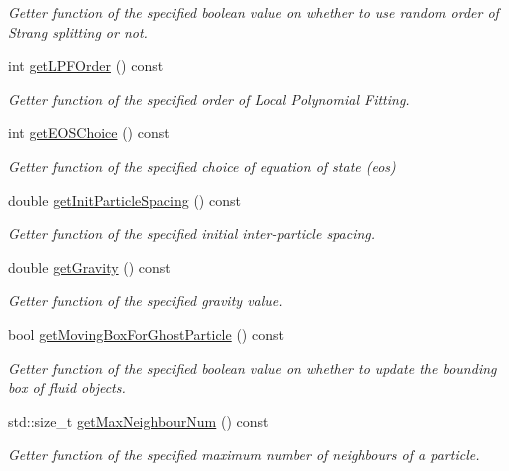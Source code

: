\begin{DoxyCompactItemize}
\begin{DoxyCompactList}\small\item\em Getter function of the specified boolean value on whether to use random order of Strang splitting or not. \end{DoxyCompactList}\item 
int \hyperlink{classInitializer_a03411fd19b6b3141b80652646a2a3796}{get\-L\-P\-F\-Order} () const 
\begin{DoxyCompactList}\small\item\em Getter function of the specified order of Local Polynomial Fitting. \end{DoxyCompactList}\item 
int \hyperlink{classInitializer_a2107696e4b4638f9752ba4a2b2e9c57e}{get\-E\-O\-S\-Choice} () const 
\begin{DoxyCompactList}\small\item\em Getter function of the specified choice of equation of state (eos) \end{DoxyCompactList}\item 
double \hyperlink{classInitializer_a70bb3a249925f55e2e1581bdc960b260}{get\-Init\-Particle\-Spacing} () const 
\begin{DoxyCompactList}\small\item\em Getter function of the specified initial inter-\/particle spacing. \end{DoxyCompactList}\item 
double \hyperlink{classInitializer_a29d827fbcc690011796160e9c372819c}{get\-Gravity} () const 
\begin{DoxyCompactList}\small\item\em Getter function of the specified gravity value. \end{DoxyCompactList}\item 
bool \hyperlink{classInitializer_abf444acdb91394def021a2f74ab5243f}{get\-Moving\-Box\-For\-Ghost\-Particle} () const 
\begin{DoxyCompactList}\small\item\em Getter function of the specified boolean value on whether to update the bounding box of fluid objects. \end{DoxyCompactList}\item 
std\-::size\-\_\-t \hyperlink{classInitializer_a32b46cefcbeccae88af7a46bed5949ee}{get\-Max\-Neighbour\-Num} () const 
\begin{DoxyCompactList}\small\item\em Getter function of the specified maximum number of neighbours of a particle. \end{DoxyCompactList}\item 

\end{DoxyCompactItemize}
